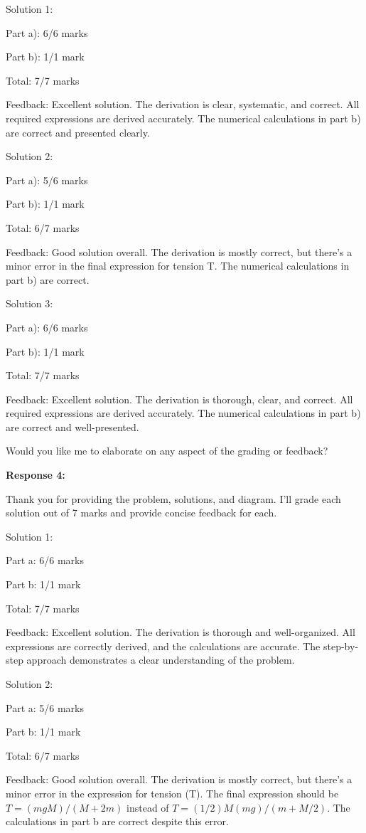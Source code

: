 \documentclass[a4paper,11pt]{article}
\begin{document}
Solution 1:

Part a): 6/6 marks

Part b): 1/1 mark

Total: 7/7 marks

Feedback: Excellent solution. The derivation is clear, systematic, and correct. All required expressions are derived accurately. The numerical calculations in part b) are correct and presented clearly.

Solution 2:

Part a): 5/6 marks

Part b): 1/1 mark

Total: 6/7 marks

Feedback: Good solution overall. The derivation is mostly correct, but there's a minor error in the final expression for tension T. The numerical calculations in part b) are correct.

Solution 3:

Part a): 6/6 marks

Part b): 1/1 mark

Total: 7/7 marks

Feedback: Excellent solution. The derivation is thorough, clear, and correct. All required expressions are derived accurately. The numerical calculations in part b) are correct and well-presented.

Would you like me to elaborate on any aspect of the grading or feedback?

\bigskip
\textbf{Response 4:}

Thank you for providing the problem, solutions, and diagram. I'll grade each solution out of 7 marks and provide concise feedback for each.

Solution 1:

Part a: 6/6 marks

Part b: 1/1 mark

Total: 7/7 marks

Feedback: Excellent solution. The derivation is thorough and well-organized. All expressions are correctly derived, and the calculations are accurate. The step-by-step approach demonstrates a clear understanding of the problem.

Solution 2:

Part a: 5/6 marks

Part b: 1/1 mark

Total: 6/7 marks

Feedback: Good solution overall. The derivation is mostly correct, but there's a minor error in the expression for tension (T). The final expression should be \(T = (mgM)/(M + 2m)\) instead of \(T = (1/2)M(mg)/(m + M/2)\). The calculations in part b are correct despite this error.
\end{document}
